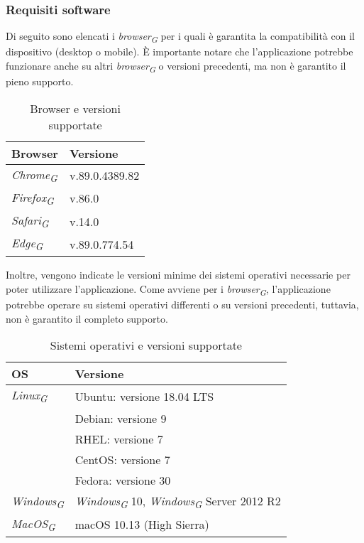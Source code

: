 \subsubsection{Requisiti software}
Di seguito sono elencati i \textit{browser}\textsubscript{\textit{G}} per i quali è garantita la compatibilità con il dispositivo (desktop o mobile). È importante notare che l'applicazione potrebbe funzionare anche su altri \textit{browser}\textsubscript{\textit{G}} o versioni precedenti, ma non è garantito il pieno supporto.  
\begin{table}[H]
    \centering
    \begin{tabular}{ll}
        \toprule
        \textbf{Browser} & \textbf{Versione} \\
        \midrule
        \textit{Chrome}\textsubscript{\textit{G}} & v.89.0.4389.82\\
        \textit{Firefox}\textsubscript{\textit{G}} & v.86.0 \\
        \textit{Safari}\textsubscript{\textit{G}} & v.14.0 \\
        \textit{Edge}\textsubscript{\textit{G}} & v.89.0.774.54 \\
        \bottomrule
    \end{tabular}
    \caption{Browser e versioni supportate}
\end{table}

Inoltre, vengono indicate le versioni minime dei sistemi operativi necessarie per poter utilizzare l'applicazione. Come avviene per i \textit{browser}\textsubscript{\textit{G}}, l'applicazione potrebbe operare su sistemi operativi differenti o su versioni precedenti, tuttavia, non è garantito il completo supporto.\\
\begin{table}[H]
    \centering
    \begin{tabular}{ll}
        \toprule
        \textbf{OS} & \textbf{Versione} \\
        \midrule
        \textit{Linux}\textsubscript{\textit{G}} & Ubuntu: versione 18.04 LTS\\&Debian: versione 9\\& RHEL: versione 7\\& CentOS: versione 7\\& Fedora: versione 30 \\
        \textit{Windows}\textsubscript{\textit{G}} & \textit{Windows}\textsubscript{\textit{G}} 10, \textit{Windows}\textsubscript{\textit{G}} Server 2012 R2 \\
        \textit{MacOS}\textsubscript{\textit{G}} & macOS 10.13 (High Sierra) \\
        \bottomrule
    \end{tabular}
    \caption{Sistemi operativi e versioni supportate}
\end{table}